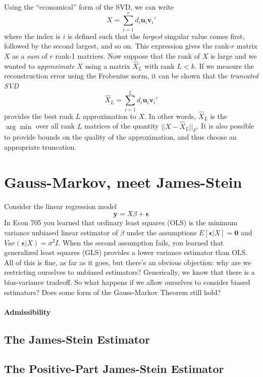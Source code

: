 \documentclass[12pt]{article}
\theoremstyle{definition}
\begin{document}
Using the ``economical'' form of the SVD, we can write
	$$X = \sum_{i=1}^r d_i \textbf{u}_i \textbf{v}_i'$$
where the index is $i$ is defined such that the \emph{largest} singular value comes first, followed by the second largest, and so on. This expression gives the rank-$r$ matrix $X$ as a \emph{sum} of $r$ rank-1 matrices. Now suppose that the rank of $X$ is large and we wanted to \emph{approximate} $X$ using a matrix $\widehat{X}_L$ with rank $L<k$. If we measure the reconstruction error using the Frobenius norm, it can be shown that the \emph{truncated SVD}
	$$\widehat{X}_L = \sum_{i=1}^{L} d_i \textbf{u}_i \textbf{v}_i'$$ 	
provides the best rank $L$ approximation to $X$. In other words, $\widehat{X}_L$ is the $\arg \min$  over all rank $L$ matrices of the quantity $||X - \widehat{X}_L||_F$. It is also possible to provide bounds on the quality of the approximation, and thus choose an appropriate truncation. 

\section{Gauss-Markov, meet James-Stein}
Consider the linear regression model
	$$\mathbf{y} = X\beta + \boldsymbol{\epsilon}$$
In Econ 705 you learned that ordinary least squares (OLS) is the minimum variance unbiased linear estimator of $\beta$ under the assumptions $E[\boldsymbol{\epsilon}|X] = \mathbf{0}$ and $Var(\mathbf{\epsilon}|X) = \sigma^2 I$. When the second assumption fails, you learned that generalized least squares (GLS) provides a lower variance estimator than OLS. All of this is fine, as far as it goes, but there's an obvious objection: why are we restricting ourselves to unbiased estimators? Generically, we know that there is a bias-variance tradeoff. So what happens if we allow ourselves to consider biased estimators? Does some form of the Gauss-Markov Theorem still hold?



\paragraph{Admissibility}

\subsection{The James-Stein Estimator}

\subsection{The Positive-Part James-Stein Estimator}
\end{document}
